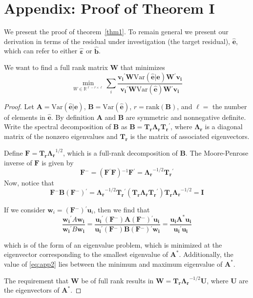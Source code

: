 \documentclass[11pt]{article} %
\newcommand{\inv}{\ensuremath{^{-1}}}
\newcommand{\ginv}{\ensuremath{^{-}}}
\newcommand{\trans}{\ensuremath{^\prime}}
\newcommand{\var}{\ensuremath{\mathrm{Var}}}
\begin{document}
\section*{Appendix: Proof of Theorem I}

We present the proof of theorem~\ref{thm1}. To remain general we present our derivation in terms of the residual under investigation (the target residual), $\widehat{\bm{e}}$, which can refer to either $\widehat{\bm{\varepsilon}}$ or $\widehat{\bm{b}}$. 

We want to find a full rank matrix $\bm{W}$ that minimizes 
\begin{equation}\label{eq:app1}
\min_{W \in \mathbb{R}^{\ell-r \times \ell} } 
\displaystyle{\sum_i} \frac{\bm{v_i}\trans \bm{W} \var(\widehat{\bm{e}} | \bm{e}) \bm{W}\trans \bm{v_i}}
		{\bm{v_i}\trans \bm{W} \var(\widehat{\bm{e}}) \bm{W}\trans \bm{v_i}}
\end{equation}

\begin{proof}
 Let $\bm{A} = \var(\widehat{\bm{e}} | \bm{e})$, $\bm{B} = \var(\widehat{\bm{e}})$, $r = \text{rank}(\bm{B})$, and $\ell = $ the number of elements in $\widehat{\bm{e}}$. By definition $\bm{A}$ and $\bm{B}$ are symmetric and nonnegative definite. Write the spectral decomposition of $\bm{B}$ as
$\bm{B} = \bm{T_r \Lambda_r T_r}\trans$, where $\bm{ \Lambda_r}$ is a diagonal matrix of the nonzero eigenvalues and $\bm{T_r}$ is the matrix of associated eigenvectors.

Define $\bm{F} = \bm{T_r \Lambda_r}^{1/2}$, which is a full-rank decomposition of $\bm{B}$. The Moore-Penrose inverse of $\bm{F}$ is given by
\[
\bm{F}\ginv = (\bm{F}\trans\bm{F})\inv \bm{F}\trans = \bm{\Lambda_r}^{-1/2} \bm{T_r}\trans
\]
Now, notice that
\[
\bm{F}\ginv \bm{B} (\bm{F}\ginv)\trans = \bm{\Lambda_r}^{-1/2} \bm{T_r}\trans ( \bm{T_r \Lambda_r T_r}\trans ) \bm{T_r \Lambda_r}^{-1/2} =  \bm{I}
\]

If we consider $\bm{w}_i = (\bm{F}\ginv)\trans \bm{u}_i$, then we find that 
\begin{equation}\label{eq:app2}
\frac{\bm{w_i}\trans A \bm{w_i}}{\bm{w_i}\trans B \bm{w_i}} = 
\frac{\bm{u_i}\trans (\bm{F}\ginv) \bm{A} (\bm{F}\ginv)\trans \bm{u_i}}{\bm{u_i}\trans(\bm{F}\ginv) \bm{B} (\bm{F}\ginv)\trans \bm{w_i}} = 
\frac{\bm{u_i} \bm{A}^* \bm{u_i}}{\bm{u_i}\trans \bm{u_i}}
\end{equation}

which is of the form of an eigenvalue problem, which is minimized at the eigenvector corresponding to the smallest eigenvalue of  $\bm{A}^*$. Additionally, the value of \eqref{eq:app2} lies between the minimum and maximum eigenvalue of $\bm{A}^*$.

The requirement that $\bm{W}$ be of full rank results in $\bm{W} = \bm{T_r \Lambda_r}^{-1/2} \bm{U}$, where $\bm{U}$ are the eigenvectors of $\bm{A}^*$.
\end{proof}
\end{document}
